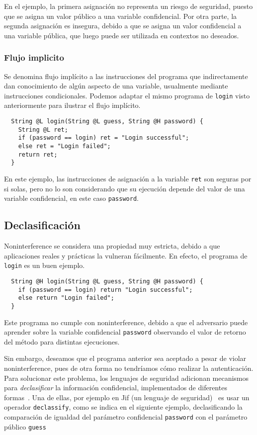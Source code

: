 En el ejemplo, la primera asignación no representa un riesgo de seguridad, puesto que se asigna un valor público a una variable confidencial. Por otra parte, la segunda asignación es insegura, debido a que se asigna un valor confidencial a una variable pública, que luego puede ser utilizada en contextos no deseados.

\subsubsection{Flujo implicito}
Se denomina flujo implícito a las instrucciones del programa que indirectamente dan conocimiento de algún aspecto de una variable, usualmente mediante instrucciones condicionales. Podemos adaptar el mismo programa de \texttt{login} visto anteriormente para ilustrar el flujo implícito.

\begin{lstlisting}
  String @L login(String @L guess, String @H password) {
    String @L ret;
    if (password == login) ret = "Login successful";
    else ret = "Login failed";
    return ret;
  }
\end{lstlisting}

En este ejemplo, las instrucciones de asignación a la variable \texttt{ret} son seguras por si solas, pero no lo son considerando que su ejecución depende del valor de una variable confidencial, en este caso \texttt{password}.

\subsection{Declasificación}
Noninterference se considera una propiedad muy estricta, debido a que aplicaciones reales y prácticas la vulneran fácilmente. En efecto, el programa de \texttt{login} es un buen ejemplo.

\begin{lstlisting}
  String @H login(String @L guess, String @H password) {
    if (password == login) return "Login successful";
    else return "Login failed";
  }
\end{lstlisting}

Este programa no cumple con noninterference, debido a que el adversario puede aprender sobre la variable confidencial \texttt{password} observando el valor de retorno del método para distintas ejecuciones.

Sin embargo, deseamos que el programa anterior sea aceptado a pesar de violar noninterference, pues de otra forma no tendríamos cómo realizar la autenticación. Para solucionar este problema, los lenguajes de seguridad adicionan mecanismos para \textit{declasificar} la información confidencial, implementados de diferentes formas~\cite{sabelfeldSands:JCS09}. Una de ellas, por ejemplo en Jif (un lenguaje de seguridad)~\cite{jif} es usar un operador \texttt{declassify}, como se indica en el siguiente ejemplo, declasificando la comparación de igualdad del parámetro confidencial \texttt{password} con el parámetro público \texttt{guess}

